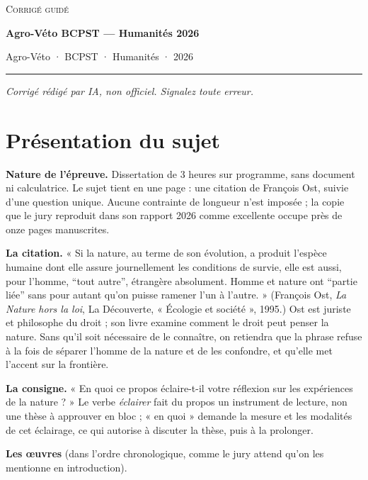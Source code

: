 \documentclass[11pt,a4paper]{article}
\begin{document}
\thispagestyle{plain}
\begin{center}
  {\small\scshape Corrigé guidé}\par\smallskip
  {\LARGE\bfseries Agro-Véto BCPST — Humanités 2026\par}\medskip
  {\large Agro-Véto · BCPST · Humanités · 2026\par}
\end{center}
\vspace{2pt}\hrule\vspace{8pt}

\emph{Corrigé rédigé par IA, non officiel. Signalez toute erreur.}

\hypertarget{pruxe9sentation-du-sujet}{%
\section{Présentation du sujet}\label{pruxe9sentation-du-sujet}}

\textbf{Nature de l'épreuve.} Dissertation de 3 heures sur programme, sans document ni calculatrice. Le sujet tient en une page : une citation de François Ost, suivie d'une question unique. Aucune contrainte de longueur n'est imposée ; la copie que le jury reproduit dans son rapport 2026 comme excellente occupe près de onze pages manuscrites.

\textbf{La citation.} « Si la nature, au terme de son évolution, a produit l'espèce humaine dont elle assure journellement les conditions de survie, elle est aussi, pour l'homme, ``tout autre'', étrangère absolument. Homme et nature ont ``partie liée'' sans pour autant qu'on puisse ramener l'un à l'autre. » (François Ost, \emph{La Nature hors la loi}, La Découverte, « Écologie et société », 1995.) Ost est juriste et philosophe du droit ; son livre examine comment le droit peut penser la nature. Sans qu'il soit nécessaire de le connaître, on retiendra que la phrase refuse à la fois de séparer l'homme de la nature et de les confondre, et qu'elle met l'accent sur la frontière.

\textbf{La consigne.} « En quoi ce propos éclaire-t-il votre réflexion sur les expériences de la nature ? » Le verbe \emph{éclairer} fait du propos un instrument de lecture, non une thèse à approuver en bloc ; « en quoi » demande la mesure et les modalités de cet éclairage, ce qui autorise à discuter la thèse, puis à la prolonger.

\textbf{Les œuvres} (dans l'ordre chronologique, comme le jury attend qu'on les mentionne en introduction).
\end{document}
